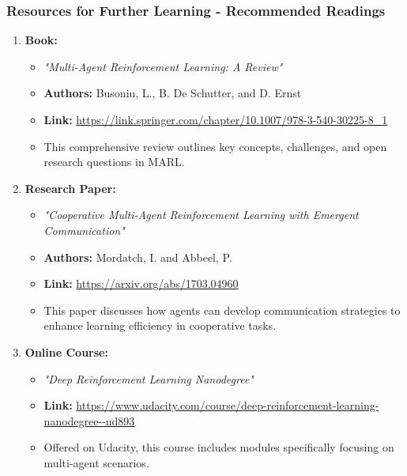 \documentclass[aspectratio=169]{beamer}
\begin{document}
\begin{frame}[fragile]
    \frametitle{Resources for Further Learning - Recommended Readings}
    \begin{enumerate}
        \item \textbf{Book:} 
        \begin{itemize}
            \item \textit{"Multi-Agent Reinforcement Learning: A Review"}
            \item \textbf{Authors:} Busoniu, L., B. De Schutter, and D. Ernst
            \item \textbf{Link:} \url{https://link.springer.com/chapter/10.1007/978-3-540-30225-8_1}
            \item This comprehensive review outlines key concepts, challenges, and open research questions in MARL.
        \end{itemize}
        
        \item \textbf{Research Paper:}
        \begin{itemize}
            \item \textit{"Cooperative Multi-Agent Reinforcement Learning with Emergent Communication"}
            \item \textbf{Authors:} Mordatch, I. and Abbeel, P.
            \item \textbf{Link:} \url{https://arxiv.org/abs/1703.04960}
            \item This paper discusses how agents can develop communication strategies to enhance learning efficiency in cooperative tasks.
        \end{itemize}
        
        \item \textbf{Online Course:}
        \begin{itemize}
            \item \textit{"Deep Reinforcement Learning Nanodegree"}
            \item \textbf{Link:} \url{https://www.udacity.com/course/deep-reinforcement-learning-nanodegree--nd893}
            \item Offered on Udacity, this course includes modules specifically focusing on multi-agent scenarios.
        \end{itemize}
    \end{enumerate}
\end{frame}
\end{document}
